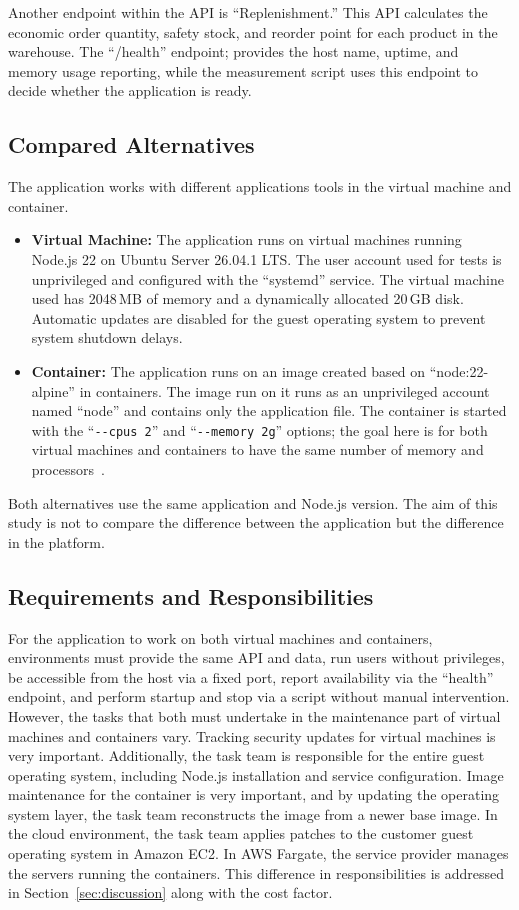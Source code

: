 \documentclass[conference,a4paper]{IEEEtran}
\begin{document}
Another endpoint within the API is ``Replenishment.'' This API calculates the economic order quantity, safety stock, and reorder point for each product in the warehouse. The ``/health'' endpoint; provides the host name, uptime, and memory usage reporting, while the measurement script uses this endpoint to decide whether the application is ready.

\subsection{Compared Alternatives}
The application works with different applications tools in the virtual machine and container.
\begin{itemize}
	\item \textbf{Virtual Machine:} The application runs on virtual machines running Node.js 22 on Ubuntu Server 26.04.1 LTS. The user account used for tests is unprivileged and configured with the ``systemd'' service. The virtual machine used has 2048\,MB of memory and a dynamically allocated 20\,GB disk. Automatic updates are disabled for the guest operating system to prevent system shutdown delays.
	\item \textbf{Container:} The application runs on an image created based on ``node:22-alpine'' in containers. The image run on it runs as an unprivileged account named ``node'' and contains only the application file. The container is started with the ``\texttt{-{}-cpus 2}'' and ``\texttt{-{}-memory 2g}'' options; the goal here is for both virtual machines and containers to have the same number of memory and processors~\cite{b3}.
\end{itemize}
Both alternatives use the same application and Node.js version. The aim of this study is not to compare the difference between the application but the difference in the platform.

\subsection{Requirements and Responsibilities}
For the application to work on both virtual machines and containers, environments must provide the same API and data, run users without privileges, be accessible from the host via a fixed port, report availability via the ``health'' endpoint, and perform startup and stop via a script without manual intervention. However, the tasks that both must undertake in the maintenance part of virtual machines and containers vary. Tracking security updates for virtual machines is very important. Additionally, the task team is responsible for the entire guest operating system, including Node.js installation and service configuration. Image maintenance for the container is very important, and by updating the operating system layer, the task team reconstructs the image from a newer base image. In the cloud environment, the task team applies patches to the customer guest operating system in Amazon EC2. In AWS Fargate, the service provider manages the servers running the containers. This difference in responsibilities is addressed in Section~\ref{sec:discussion} along with the cost factor.
\end{document}

